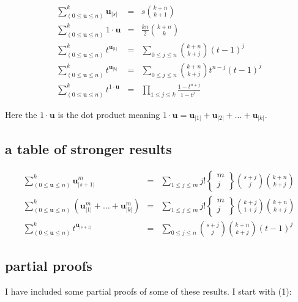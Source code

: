 \documentclass[twoside]{amsart}
\newcommand{\bu}[1][u]{\ensuremath{\mathbf #1}}
\begin{document}
\begin{eqnarray}
\sum_{(0\le\bu\le n)}^k\!\!\!\!\! \bu_{|s|}
 & = & s{k+n\choose k+1}                                                    \\
\sum_{(0\le\bu\le n)}^k\!\!\!\!\! 1\cdot\bu  
 & = & \frac{kn}{2} {k+n\choose k}                                          \\ 
\sum_{(0\le\bu\le n)}^k\!\!\!\!\! t^{\bu_{|1|}} 
 & = & \sum_{0\le j\le n}{k+n\choose k+j}(t-1)^j                            \\
\sum_{(0\le\bu\le n)}^k\!\!\!\!\! t^{\bu_{|k|}} 
 & = & \sum_{0\le j\le n}{k+n\choose k+j}t^{n-j}(t-1)^j                     \\
\sum_{(0\le\bu\le n)}^k\!\!\!\!\! t^{1\cdot\bu}           
 & = & \prod_{1\le j\le k}\frac{1-t^{n+j}}{1-t^{j\ \ \ }}                   
\end{eqnarray}  

Here the $ 1\cdot\bu $ is the dot product meaning $ 1\cdot\bu=\bu_{|1|}+\bu_{|2|}+\ldots+\bu_{|k|} $.

\subsection{a table of stronger results}

\begin{eqnarray}
\sum_{(0\le\bu\le n)}^k\!\!\!\!\! \bu_{|s+1|}^m 
 & = & \sum_{1\le j\le m}j!\left\{\!\!\!\begin{array}{c} m \\ j 
       \end{array}\!\!\!\right\}{s+j\choose j}{k+n\choose k+j}              \\
\sum_{(0\le\bu\le n)}^k\!\!\!\!\! (\bu_{|1|}^m+\ldots +\bu_{|k|}^m)
 & = & \sum_{1\le j\le m}j!\left\{\!\!\!\begin{array}{c} m \\ j 
       \end{array}\!\!\!\right\}{k+j\choose 1+j}{k+n\choose k+j}            \\
\sum_{(0\le\bu\le n)}^k\!\!\!\!\! t^{\bu_{|s+1|}}
 & = & \sum_{0\le j\le n}{s+j\choose j}{k+n\choose k+j}(t-1)^j                
\end{eqnarray} 

\subsection{partial proofs}

I have included some partial proofs of some of these results.  I start with (1):
\end{document}
